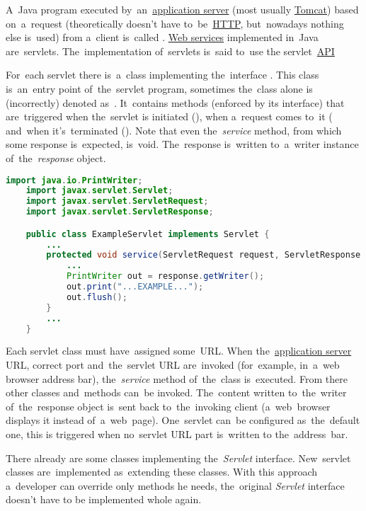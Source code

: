 \label{servlet}
A~Java program executed by~an~\hyperref[applicationserver]{application server} (most usually \hyperref[tomcat]{Tomcat}) based on~a~request (theoretically doesn't have to~be~\hyperref[http]{HTTP}, but~nowadays nothing else is~used) from a~client is~called .
\hyperref[webserviceapplication]{Web services} implemented in~Java are~servlets.
The~implementation of~servlets is~said to~use the servlet~\hyperref[api]{API}

For~each servlet there is~a~class implementing the~interface .
This class is~an~entry point of~the~servlet program, sometimes the~class alone is (incorrectly) denoted as~.
It~contains methods (enforced by its interface) that are~triggered when the~servlet is initiated (), when a~request comes to~it ( and~when it's~terminated ().
Note that even the~\textit{service} method, from which some response is~expected, is~void.
The~response is~written to~a~writer instance of~the~\textit{response} object.

\example
\begin{lstlisting}[language=Java]
    import java.io.PrintWriter;
    import javax.servlet.Servlet;
    import javax.servlet.ServletRequest;
    import javax.servlet.ServletResponse;

    public class ExampleServlet implements Servlet {
        ...
        protected void service(ServletRequest request, ServletResponse response) {
            ...
            PrintWriter out = response.getWriter();
            out.print("...EXAMPLE...");
            out.flush();
        }
        ...
    }
\end{lstlisting}

Each servlet class must have~assigned some~URL\@.
When the~\hyperref[applicationserver]{application server} URL, correct port and~the~servlet URL are~invoked (for~example, in~a~web browser address bar), the~\textit{service} method of~the~class is~executed.
From there other classes and~methods can~be invoked.
The~content written to~the~writer of~the~response object is~sent back to~the~invoking client (a~web~browser displays it instead of~a~web~page).
One~servlet can~be configured as~the~default one, this is triggered when no~servlet URL part is~written to the~address~bar.

There already are some classes implementing the~\textit{Servlet} interface.
New~servlet classes are~implemented as~extending these classes.
With this approach a~developer can override only methods he needs, the~original \textit{Servlet} interface doesn't have to be implemented whole again.

